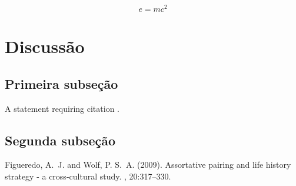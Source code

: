 \documentclass[twoside,twocolumn]{article}
\begin{document}
\blindtext

\begin{equation}
\label{eq:emc}
e = mc^2
\end{equation}

\blindtext


\section{Discussão}

\subsection{Primeira subseção}

A statement requiring citation \cite{Figueredo:2009dg}.
\blindtext

\subsection{Segunda subseção}

\blindtext


\begin{thebibliography}{99}

Figueredo, A.~J. and Wolf, P. S.~A. (2009).
\newblock Assortative pairing and life history strategy - a cross-cultural
  study.
, 20:317--330.
 
\end{thebibliography}

\end{document}
